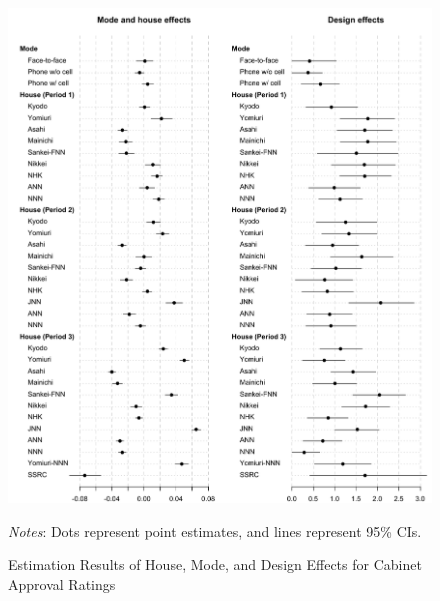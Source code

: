 \documentclass[12pt,letterpaper]{scrartcl}
\begin{document}
\begin{figure}[p]
\begin{minipage}{\hsize}
\centering
\singlespacing
\includegraphics[scale=1]{Figure_JCR/miscellaneous_cabinet_approval.pdf}
\caption{Estimation Results of House, Mode, and Design Effects for Cabinet Approval Ratings}
\label{house_mode_design_cabinet}
\end{minipage}
\begin{minipage}{\hsize}
\singlespacing
\small
\emph{Notes}: Dots represent point estimates, and lines represent 95\% CIs.
\end{minipage}
\end{figure}
\end{document}
